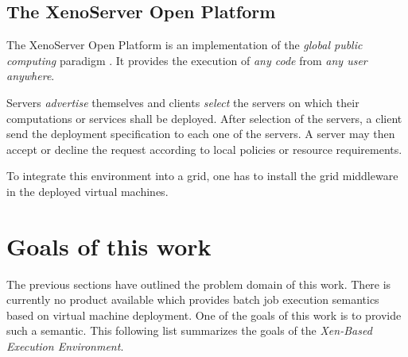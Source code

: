 \subsection{The XenoServer Open Platform}

The  XenoServer Open  Platform is  an implementation  of  the \emph{global
  public   computing}  paradigm   \cite{kotsovinos05}.  It   provides  the
execution of \emph{any code} from \emph{any user} \emph{anywhere}.

Servers \emph{advertise} themselves  and clients \emph{select} the servers
on which their computations or services shall be deployed. After selection
of the servers, a client send  the deployment specification to each one of
the servers. A server may then  accept or decline the request according to
local policies or resource requirements.

To integrate  this environment into  a grid, one  has to install  the grid
middleware in the deployed virtual machines.

\section{Goals of this work}
\label{sec:goals}

The previous sections have outlined the problem domain of this work. There
is  currently no  product  available which  provides  batch job  execution
semantics based on  virtual machine deployment.  One of  the goals of this
work is  to provide  such a semantic.  This following list  summarizes the
goals of the \emph{Xen-Based Execution Environment}.

